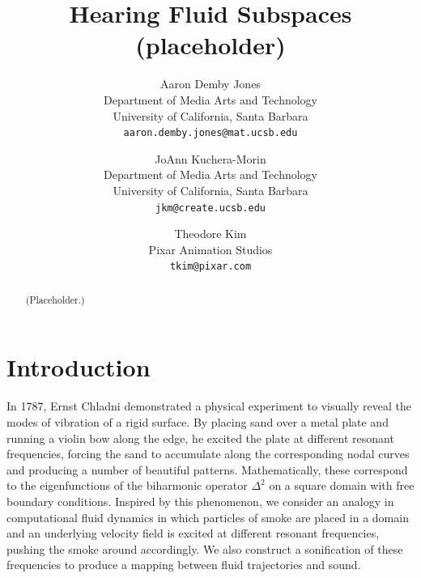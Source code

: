 \documentclass[11pt]{article}
\title{Hearing Fluid Subspaces (placeholder)}
\author{ Aaron Demby Jones\\
Department of Media Arts and Technology\\ University of California, Santa Barbara\\
{\tt aaron.demby.jones@mat.ucsb.edu}
\and
JoAnn Kuchera-Morin\\
Department of Media Arts and Technology\\ University of California, Santa Barbara\\
{\tt jkm@create.ucsb.edu}
\and
Theodore Kim\\
Pixar Animation Studios\\ 
{\tt tkim@pixar.com}
}
\date{}				%
\begin{document}
\newcommand{\UU}{\mathbf{U}}
\newcommand{\uu}{\mathbf{u}}
\newcommand{\vv}{\mathbf{v}}
\newcommand{\utilde}{\mathbf{q}}
\newcommand{\ff}{\mathbf{f}}
\newcommand{\qq}{\mathbf{q}}
\newcommand{\aaa}{\mathbf{a}}
\newcommand{\R}{\mathbb{R}}

\maketitle

\thispagestyle{empty}

\begin{abstract}
(Placeholder.)
\end{abstract}


\section*{Introduction}
In 1787, Ernst Chladni demonstrated a physical experiment to visually reveal the modes of vibration of a rigid surface. By placing sand over a metal plate and running a violin bow along the edge, he excited the plate at different resonant frequencies, forcing the sand to accumulate along the corresponding nodal curves and producing a number of beautiful patterns. Mathematically, these correspond to the eigenfunctions of the biharmonic operator $\Delta^2$ on a square domain with free boundary conditions. Inspired by this phenomenon, we consider an analogy in computational fluid dynamics in which particles of smoke are placed in a domain and an underlying velocity field is excited at different resonant frequencies, pushing the smoke around accordingly. We also construct a sonification of these frequencies to produce a mapping between fluid trajectories and sound.
\end{document}
